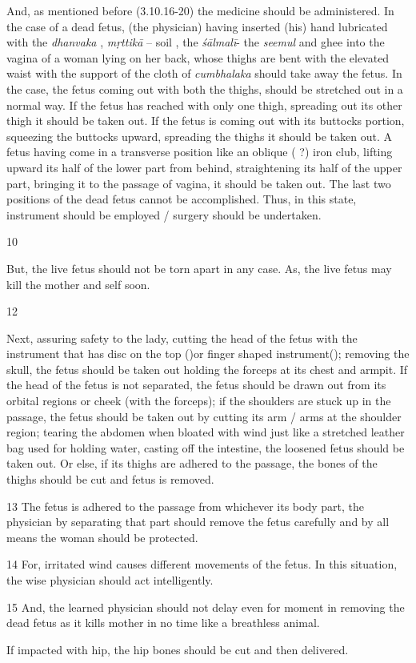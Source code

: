 \begin{translation}
And, as mentioned before (3.10.16-20) the medicine should be
administered. In the case of a dead fetus, (the physician) having
inserted (his) hand lubricated with the \emph{dhanvaka} , \emph{mṛttikā} 
– soil ,
the \emph{śālmalī}- the \emph{seemul} and ghee into the vagina of a woman 
lying on her
back, whose thighs are bent with the elevated waist with the support of
the cloth of \emph{cumbhalaka}  should take away the fetus. In the case, 
the
fetus coming out with both the thighs, should be stretched out in a
normal way. If the fetus has reached with only one thigh, spreading out
its other thigh it should be taken out. If the fetus is coming out with
its buttocks portion, squeezing the buttocks upward, spreading the thighs
it should be taken out. A fetus having come in a transverse position like
an oblique ( ?) iron club, lifting upward its half of
the lower part from behind, straightening its half of the upper part,
bringing it to the passage of vagina, it should be taken out. The last
two positions of the dead fetus cannot be accomplished. Thus, in this
state, instrument should be employed / surgery should be undertaken.

\item[10] 

But, the live fetus should not be torn apart in any case. As, the live
fetus may kill the mother and self soon.

\item[12]	

Next, assuring safety to the lady, cutting the head of the fetus with the
instrument that has disc on the top ()or finger shaped
instrument(); removing the skull, the fetus should be
taken out holding the forceps at its chest and armpit. If the head of the
fetus is not separated, the fetus should be drawn out from its orbital
regions or cheek (with the forceps); if the shoulders are stuck up in the
passage, the fetus should be taken out by cutting its arm / arms at
the shoulder region; tearing the abdomen when bloated with wind just like
a stretched leather bag used for holding water, casting off the
intestine, the loosened fetus should be taken out. Or else, if its thighs
are adhered to the passage, the bones of the thighs should be cut and
fetus is removed.

\item[13]	The fetus is adhered to the passage from whichever its body part, the 
physician by separating that part should remove the fetus carefully and by all 
means the woman should be protected.

\item[14]
For, irritated wind causes different movements of the fetus. In this situation, the 
wise physician should act intelligently. 

\item[15]	And, the learned physician should not delay even for moment in 
removing the dead fetus as it kills mother in no time like a breathless animal.  

If impacted with hip, the hip bones should be cut and then delivered.

   
\end{translation}

